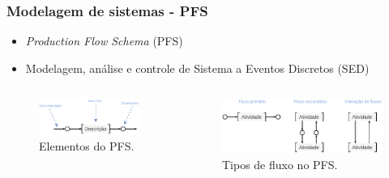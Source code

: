 \documentclass[10pt]{beamer}
\begin{document}
\begin{frame}
	
	\frametitle{Modelagem de sistemas - PFS} 
	
	\begin{itemize}
		\item \textit{Production Flow Schema} (PFS)
		\item Modelagem, análise e controle de Sistema a Eventos Discretos (SED)
	\end{itemize}

	\begin{columns}[c] %
		\begin{figure}[htb]
			\centering
			\caption{Elementos do PFS.}
			\label{fig:pfs-elementos}
			\includegraphics[width=1\textwidth]{pfs-elementos}
		\end{figure}
		
		\begin{figure}[htb]
			\centering
			\caption{Tipos de fluxo no PFS.}
			\label{fig:pfs-fluxos}
			\includegraphics[width=1\textwidth]{pfs-fluxos}
		\end{figure}
		
	\end{columns}
	
\end{frame}

\end{document}
